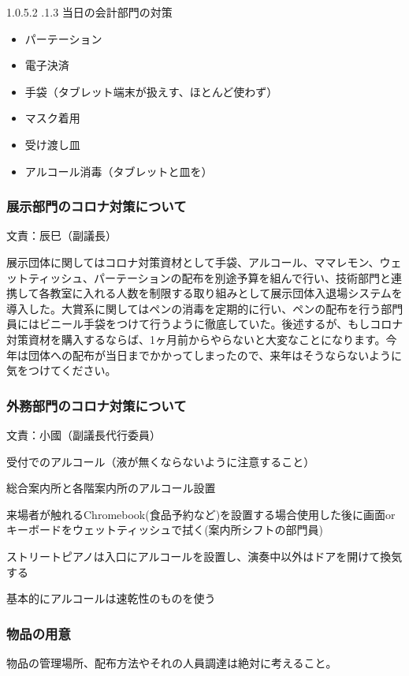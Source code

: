 \documentclass[dvipdfmx,jb5]{jarticle}
\makeatletter
\newcommand{\subsubsubsection}{\@startsection{paragraph}{4}{\z@}%
    {1.0\Cvs \@plus.5\Cdp \@minus.2\Cdp}%
    {.1\Cvs \@plus.3\Cdp}%
    {\reset@font}
  }
\makeatother
\begin{document}
\subsubsubsection{当日の会計部門の対策}
\begin{itemize}
  \item パーテーション
  \item 電子決済
  \item 手袋（タブレット端末が扱えす、ほとんど使わず）
  \item マスク着用
  \item 受け渡し皿
  \item アルコール消毒（タブレットと皿を）
\end{itemize}

\subsubsection{展示部門のコロナ対策について} 文責：辰巳（副議長） \vspace{2mm}

展示団体に関してはコロナ対策資材として手袋、アルコール、ママレモン、ウェットティッシュ、パーテーションの配布を別途予算を組んで行い、技術部門と連携して各教室に入れる人数を制限する取り組みとして展示団体入退場システムを導入した。大賞系に関してはペンの消毒を定期的に行い、ペンの配布を行う部門員にはビニール手袋をつけて行うように徹底していた。後述するが、もしコロナ対策資材を購入するならば、1ヶ月前からやらないと大変なことになります。今年は団体への配布が当日までかかってしまったので、来年はそうならないように気をつけてください。

\subsubsection{外務部門のコロナ対策について} 文責：小國（副議長代行委員） \vspace{2mm}

受付でのアルコール（液が無くならないように注意すること）

総合案内所と各階案内所のアルコール設置

来場者が触れるChromebook(食品予約など)を設置する場合使用した後に画面orキーボードをウェットティッシュで拭く(案内所シフトの部門員)

ストリートピアノは入口にアルコールを設置し、演奏中以外はドアを開けて換気する

基本的にアルコールは速乾性のものを使う

\subsubsection{物品の用意}
物品の管理場所、配布方法やそれの人員調達は絶対に考えること。
\end{document}
